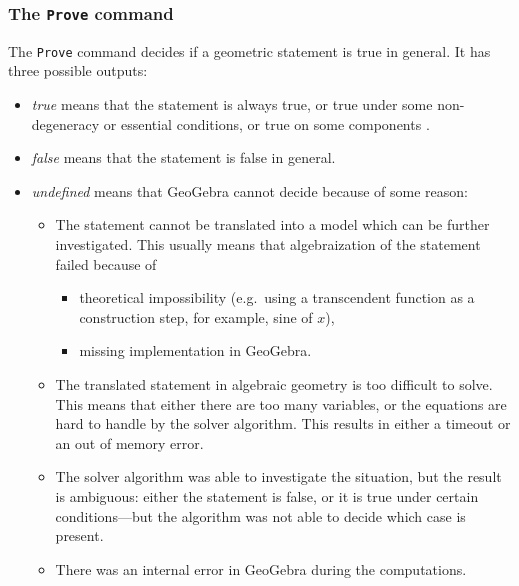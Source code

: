 \documentclass{article}
\begin{document}
\subsubsection{The \texttt{Prove} command}
The \texttt{Prove} command decides if a geometric statement is true in general. It has three possible outputs:
\begin{itemize}
    \item \textit{true} means that the statement is always true, or true under some non-degeneracy \cite{Chou} or essential \cite{KovacsRecioSolyomGecse} conditions, or true on some components \cite{ZhouWangSun}.
    \item \textit{false} means that the statement is false in general.
    \item \textit{undefined} means that GeoGebra cannot decide because of some reason:
    \begin{itemize}
        \item The statement cannot be translated into a model which can be further investigated. This usually means that algebraization of the statement failed because of 
        \begin{itemize}
            \item theoretical impossibility (e.g.~using a transcendent function as a construction step, for example, sine of $x$),
            \item missing implementation in GeoGebra.
        \end{itemize}
        \item The translated statement in algebraic geometry is too difficult to solve. This means that either there are too many variables, or the equations are hard to handle by the solver algorithm. This results in either a timeout or an out of memory error.
        \item The solver algorithm was able to investigate the situation, but the result is ambiguous: either the statement is false, or it is true under certain conditions---but the algorithm was not able to decide which case is present.
        \item There was an internal error in GeoGebra during the computations.
    \end{itemize}
\end{itemize}

\vfill\eject %
\end{document}
